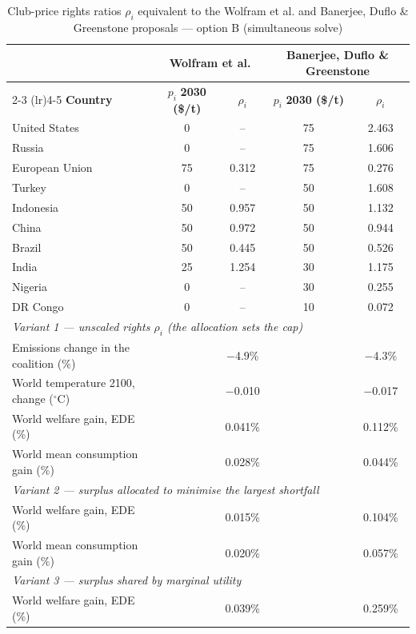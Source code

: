 \begin{table}[htbp]
\centering
\small
\caption{Club-price rights ratios $\rho_i$ equivalent to the Wolfram et al. and Banerjee, Duflo \& Greenstone proposals --- option B (simultaneous solve)}
\renewcommand{\arraystretch}{1.15}
\begin{tabular}{lcccc}
  \toprule
  & \multicolumn{2}{c}{\textbf{Wolfram et al.}} & \multicolumn{2}{c}{\textbf{Banerjee, Duflo \& Greenstone}} \\
  \cmidrule(lr){2-3} \cmidrule(lr){4-5}
  \textbf{Country} & $p_i$ \textbf{2030 (\$/t)} & $\rho_i$ & $p_i$ \textbf{2030 (\$/t)} & $\rho_i$ \\
  \midrule
  United States & 0 & -- & 75 & 2.463 \\
  Russia & 0 & -- & 75 & 1.606 \\
  European Union & 75 & 0.312 & 75 & 0.276 \\
  Turkey & 0 & -- & 50 & 1.608 \\
  Indonesia & 50 & 0.957 & 50 & 1.132 \\
  China & 50 & 0.972 & 50 & 0.944 \\
  Brazil & 50 & 0.445 & 50 & 0.526 \\
  India & 25 & 1.254 & 30 & 1.175 \\
  Nigeria & 0 & -- & 30 & 0.255 \\
  DR Congo & 0 & -- & 10 & 0.072 \\
  \midrule
  \multicolumn{5}{l}{\textit{Variant 1 --- unscaled rights $\rho_i$ (the allocation sets the cap)}} \\
  \quad Emissions change in the coalition (\%) &  & $-$4.9\% &  & $-$4.3\% \\
  \quad World temperature 2100, change ($^\circ$C) &  & $-$0.010 &  & $-$0.017 \\
  \quad World welfare gain, EDE (\%) &  & 0.041\% &  & 0.112\% \\
  \quad World mean consumption gain (\%) &  & 0.028\% &  & 0.044\% \\
  \midrule
  \multicolumn{5}{l}{\textit{Variant 2 --- surplus allocated to minimise the largest shortfall}} \\
  \quad World welfare gain, EDE (\%) &  & 0.015\% &  & 0.104\% \\
  \quad World mean consumption gain (\%) &  & 0.020\% &  & 0.057\% \\
  \midrule
  \multicolumn{5}{l}{\textit{Variant 3 --- surplus shared by marginal utility}} \\
  \quad World welfare gain, EDE (\%) &  & 0.039\% &  & 0.259\% \\

\end{tabular}
\end{table}
